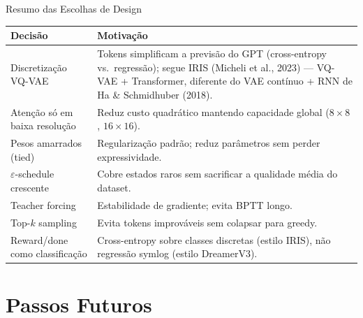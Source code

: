\documentclass[11pt,aspectratio=169]{beamer}
\begin{document}
\begin{frame}{Resumo das Escolhas de Design}
  \footnotesize
  \begin{table}
    \begin{tabular}{@{}p{4.3cm} p{7.6cm}@{}}
      \toprule
      \textbf{Decisão} & \textbf{Motivação} \\
      \midrule
      Discretização VQ-VAE &
        Tokens simplificam a previsão do GPT (cross-entropy vs.\ regressão);
        segue IRIS (Micheli et al., 2023) --- VQ-VAE + Transformer, diferente
        do VAE contínuo + RNN de Ha \& Schmidhuber (2018). \\[2pt]
      Atenção só em baixa resolução &
        Reduz custo quadrático mantendo capacidade global ($8{\times}8$, $16{\times}16$). \\[2pt]
      Pesos amarrados (tied) &
        Regularização padrão; reduz parâmetros sem perder expressividade. \\[2pt]
      $\varepsilon$-schedule crescente &
        Cobre estados raros sem sacrificar a qualidade média do dataset. \\[2pt]
      Teacher forcing &
        Estabilidade de gradiente; evita BPTT longo. \\[2pt]
      Top-$k$ sampling &
        Evita tokens improváveis sem colapsar para greedy. \\[2pt]
      Reward/done como classificação &
        Cross-entropy sobre classes discretas (estilo IRIS), não regressão
        symlog (estilo DreamerV3). \\
      \bottomrule
    \end{tabular}
  \end{table}
\end{frame}

\section{Passos Futuros}
\end{document}
